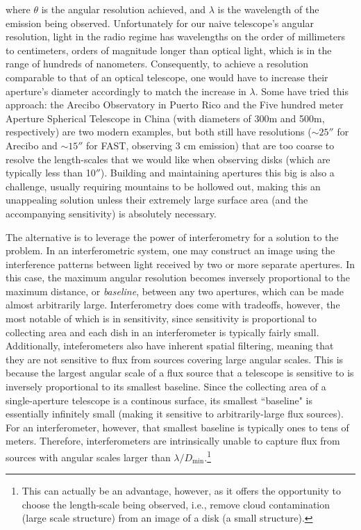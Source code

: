 \noindent where $\theta$ is the angular resolution achieved, and $\lambda$ is the wavelength of the emission being observed. Unfortunately for our naive telescope's angular resolution, light in the radio regime has wavelengths on the order of millimeters to centimeters, orders of magnitude longer than optical light, which is in the range of hundreds of nanometers. Consequently, to achieve a resolution comparable to that of an optical telescope, one would have to increase their aperture's diameter accordingly to match the increase in $\lambda$. Some have tried this approach: the Arecibo Observatory in Puerto Rico and the Five hundred meter Aperture Spherical Telescope in China (with diameters of 300m and 500m, respectively) are two modern examples, but both still have resolutions ($\sim25''$ for Arecibo and $\sim15''$ for FAST, observing 3 cm emission) that are too coarse to resolve the length-scales that we would like when observing disks (which are typically less than 10$''$). Building and maintaining apertures this big is also a challenge, usually requiring mountains to be hollowed out, making this an unappealing solution unless their extremely large surface area (and the accompanying sensitivity) is absolutely necessary.


The alternative is to leverage the power of interferometry for a solution to the problem. In an interferometric system, one may construct an image using the interference patterns between light received by two or more separate apertures. In this case, the maximum angular resolution becomes inversely proportional to the maximum distance, or \textit{baseline}, between any two  apertures, which can be made almost arbitrarily large. Interferometry does come with tradeoffs, however, the most notable of which is in sensitivity, since sensitivity is proportional to collecting area and each dish in an interferometer is typically fairly small. Additionally, inteferometers also have inherent spatial filtering, meaning that they are not sensitive to flux from sources covering large angular scales. This is because the largest angular scale of a flux source that a telescope is sensitive to is inversely proportional to its smallest baseline. Since the collecting area of a single-aperture telescope is a continous surface, its smallest ``baseline" is essentially infinitely small (making it sensitive to arbitrarily-large flux sources). For an interferometer, however, that smallest baseline is typically ones to tens of meters. Therefore, interferometers are intrinsically unable to capture flux from sources with angular scales larger than $\lambda/D_\text{min}$.\footnote{This can actually be an advantage, however, as it offers the opportunity to choose the length-scale being observed, i.e., remove cloud contamination (large scale structure) from an image of a disk (a small structure).}


